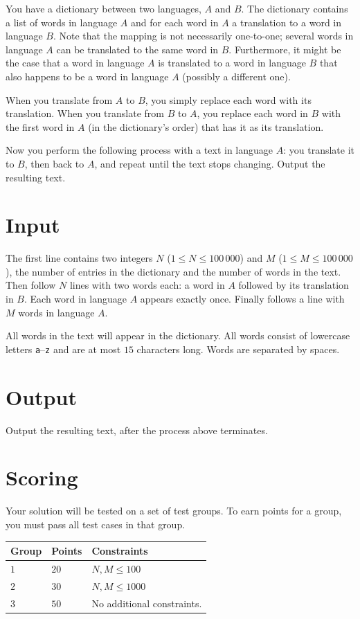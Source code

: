 You have a dictionary between two languages, $A$ and $B$. The dictionary
contains a list of words in language $A$ and for each word in $A$
a translation to a word in language $B$. Note that the mapping is
not necessarily one-to-one; several words in language $A$ can be
translated to the same word in $B$. Furthermore, it might be the case that a word in
language $A$ is translated to a word in language $B$ that
also happens to be a word in language $A$ (possibly a different one).

When you translate from $A$ to $B$, you simply replace each word with
its translation. When you translate from $B$ to $A$, you replace
each word in $B$ with the first word in $A$ (in the dictionary's order)
that has it as its translation.

Now you perform the following process with a text in language $A$:
you translate it to $B$, then back to $A$, and repeat until the text stops
changing. Output the resulting text.

\section*{Input}
The first line contains two integers $N$ ($1 \leq N \leq 100\,000$) and $M$ ($1 \leq M \leq 100\,000$), the number of entries in the dictionary and the number of words in the text. Then follow $N$ lines with two words each: a word in $A$ followed by its translation in $B$. Each word in language $A$ appears exactly once. Finally follows a line with $M$ words in language $A$.

All words in the text will appear in the dictionary. All words consist of lowercase letters \texttt{a}--\texttt{z} and are at most $15$ characters long. Words are separated by spaces.

\section*{Output}
Output the resulting text, after the process above terminates.

\section*{Scoring}
Your solution will be tested on a set of test groups.
To earn points for a group, you must pass all test cases in that group.

\noindent
\begin{tabular}{| l | l | l |}
  \hline
  \textbf{Group} & \textbf{Points} & \textbf{Constraints} \\ \hline
  $1$   & $20$       & $N, M \leq 100$ \\ \hline
  $2$   & $30$       & $N, M \leq 1000$ \\ \hline
  $3$   & $50$       & No additional constraints. \\ \hline
\end{tabular}

